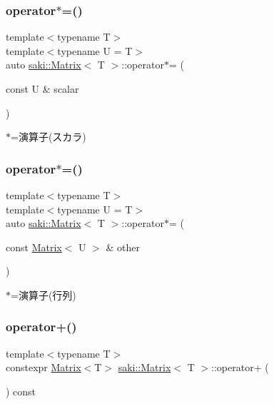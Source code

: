 \subsubsection{\texorpdfstring{operator$\ast$=()}{operator*=()}\hspace{0.1cm}{\footnotesize\ttfamily [1/2]}}
{\footnotesize\ttfamily template$<$typename T$>$ \\
template$<$typename U  = T$>$ \\
auto \mbox{\hyperlink{classsaki_1_1_matrix}{saki\+::\+Matrix}}$<$ T $>$\+::operator$\ast$= (\begin{DoxyParamCaption}\item[{const U \&}]{scalar }\end{DoxyParamCaption})\hspace{0.3cm}{\ttfamily [inline]}}



$\ast$=演算子(スカラ) 

\mbox{\label{classsaki_1_1_matrix_a66c88e0fcf5b1e86180c097ff24ceff4}} 
\subsubsection{\texorpdfstring{operator$\ast$=()}{operator*=()}\hspace{0.1cm}{\footnotesize\ttfamily [2/2]}}
{\footnotesize\ttfamily template$<$typename T$>$ \\
template$<$typename U  = T$>$ \\
auto \mbox{\hyperlink{classsaki_1_1_matrix}{saki\+::\+Matrix}}$<$ T $>$\+::operator$\ast$= (\begin{DoxyParamCaption}\item[{const \mbox{\hyperlink{classsaki_1_1_matrix}{Matrix}}$<$ U $>$ \&}]{other }\end{DoxyParamCaption})\hspace{0.3cm}{\ttfamily [inline]}}



$\ast$=演算子(行列) 

\mbox{\label{classsaki_1_1_matrix_a94797edf2e87a6242a5441ad219dc825}} 
\subsubsection{\texorpdfstring{operator+()}{operator+()}}
{\footnotesize\ttfamily template$<$typename T$>$ \\
constexpr \mbox{\hyperlink{classsaki_1_1_matrix}{Matrix}}$<$T$>$ \mbox{\hyperlink{classsaki_1_1_matrix}{saki\+::\+Matrix}}$<$ T $>$\+::operator+ (\begin{DoxyParamCaption}{ }\end{DoxyParamCaption}) const\hspace{0.3cm}{\ttfamily [inline]}}



